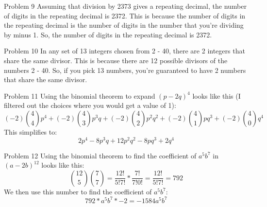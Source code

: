 \documentclass[12pt]{article}
\begin{document}
    \begin{problem}{Problem 9}
        Assuming that division by 2373 gives a repeating decimal, the number of digits in the repeating decimal is 2372.
        This is because the number of digits in the repeating decimal is the number of digits in the number that you're
        dividing by minus 1. So, the number of digits in the repeating decimal is 2372.
    \end{problem}

    \begin{problem}{Problem 10}
        In any set of 13 integers chosen from 2 - 40, there are 2 integers that share the same divisor. This is because
        there are 12 possible divisors of the numbers 2 - 40. So, if you pick 13 numbers, you're guaranteed to have 2
        numbers that share the same divisor.
    \end{problem}

    \begin{problem}{Problem 11}
        Using the binomial theorem to expand $(p - 2q)^4$ looks like this (I filtered out the choices where you would get a value of 1):
        \[(-2)\binom{4}{4}p^4 + (-2)\binom{4}{3}p^3q + (-2)\binom{4}{2}p^2q^2 + (-2)\binom{4}{1}pq^3 + (-2)\binom{4}{0}q^4\]
        This simplifies to:
        \[2p^4 - 8p^3q + 12p^2q^2 - 8pq^3 + 2q^4\]
    \end{problem}

    \begin{problem}{Problem 12}
        Using the binomial theorem to find the coefficient of $a^5b^7$ in $(a - 2b)^{12}$ looks like this:
        \[\binom{12}{5}\binom{7}{7} = \frac{12!}{5!7!} * \frac{7!}{7!0!} = \frac{12!}{5!7!} = 792\]
        We then use this number to find the coefficient of $a^5b^7$:
        \[792 * a^5b^7 * -2 = -1584a^5b^7\]
    \end{problem}
    
\end{document}
